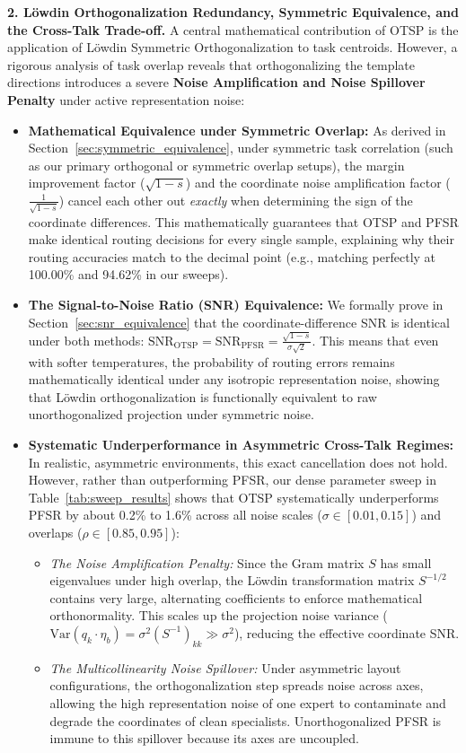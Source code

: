 \textbf{2. L{\"o}wdin Orthogonalization Redundancy, Symmetric Equivalence, and the Cross-Talk Trade-off.}
A central mathematical contribution of OTSP is the application of L{\"o}wdin Symmetric Orthogonalization to task centroids. However, a rigorous analysis of task overlap reveals that orthogonalizing the template directions introduces a severe \textbf{Noise Amplification and Noise Spillover Penalty} under active representation noise:
\begin{itemize}
    \item \textbf{Mathematical Equivalence under Symmetric Overlap:} As derived in Section~\ref{sec:symmetric_equivalence}, under symmetric task correlation (such as our primary orthogonal or symmetric overlap setups), the margin improvement factor ($\sqrt{1-s}$) and the coordinate noise amplification factor ($\frac{1}{\sqrt{1-s}}$) cancel each other out \textit{exactly} when determining the sign of the coordinate differences. This mathematically guarantees that OTSP and PFSR make identical routing decisions for every single sample, explaining why their routing accuracies match to the decimal point (e.g., matching perfectly at 100.00\% and 94.62\% in our sweeps).
    \item \textbf{The Signal-to-Noise Ratio (SNR) Equivalence:} We formally prove in Section~\ref{sec:snr_equivalence} that the coordinate-difference SNR is identical under both methods: $\text{SNR}_{\text{OTSP}} = \text{SNR}_{\text{PFSR}} = \frac{\sqrt{1-s}}{\sigma \sqrt{2}}$. This means that even with softer temperatures, the probability of routing errors remains mathematically identical under any isotropic representation noise, showing that Löwdin orthogonalization is functionally equivalent to raw unorthogonalized projection under symmetric noise.
    \item \textbf{Systematic Underperformance in Asymmetric Cross-Talk Regimes:} In realistic, asymmetric environments, this exact cancellation does not hold. However, rather than outperforming PFSR, our dense parameter sweep in Table~\ref{tab:sweep_results} shows that OTSP systematically underperforms PFSR by about 0.2\% to 1.6\% across all noise scales ($\sigma \in [0.01, 0.15]$) and overlaps ($\rho \in [0.85, 0.95]$):
    \begin{itemize}
        \item \textit{The Noise Amplification Penalty:} Since the Gram matrix $S$ has small eigenvalues under high overlap, the Löwdin transformation matrix $S^{-1/2}$ contains very large, alternating coefficients to enforce mathematical orthonormality. This scales up the projection noise variance ($\text{Var}(q_k \cdot \eta_b) = \sigma^2 (S^{-1})_{kk} \gg \sigma^2$), reducing the effective coordinate SNR.
        \item \textit{The Multicollinearity Noise Spillover:} Under asymmetric layout configurations, the orthogonalization step spreads noise across axes, allowing the high representation noise of one expert to contaminate and degrade the coordinates of clean specialists. Unorthogonalized PFSR is immune to this spillover because its axes are uncoupled.
    \end{itemize}
\end{itemize}

